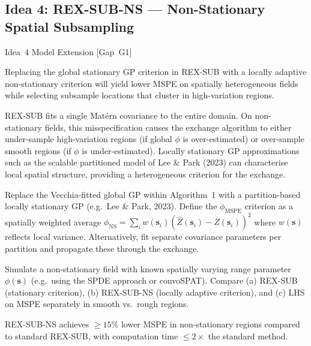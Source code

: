 \documentclass[12pt, a4paper]{article}
\newcommand{\mspe}{$\phi_{\text{MSPE}}$}
\begin{document}
\subsection{Idea 4: REX-SUB-NS --- Non-Stationary Spatial Subsampling}

\begin{ideabox}{Idea~4 \textbullet{} Model Extension [Gap~G1]}

\begin{description}[leftmargin=5em, labelwidth=4.5em]
  \item[\textbf{Hypothesis}]
    Replacing the global stationary GP criterion in REX-SUB with a locally adaptive
    non-stationary criterion will yield lower MSPE on spatially heterogeneous fields
    while selecting subsample locations that cluster in high-variation regions.

  \item[\textbf{Motivation}]
    REX-SUB fits a single Matérn covariance to the entire domain.  On non-stationary
    fields, this misspecification causes the exchange algorithm to either under-sample
    high-variation regions (if global $\phi$ is over-estimated) or over-sample smooth
    regions (if $\phi$ is under-estimated).  Locally stationary GP approximations
    such as the scalable partitioned model of Lee \& Park (2023) can characterise
    local spatial structure, providing a heterogeneous criterion for the exchange.

  \item[\textbf{Approach}]
    Replace the Vecchia-fitted global GP within Algorithm~1 with a partition-based
    locally stationary GP (e.g.\ Lee \& Park, 2023).  Define the \mspe{} criterion
    as a spatially weighted average $\phi_{\text{NS}} = \sum_i w(\mathbf{s}_i)
    (\hat{Z}(\mathbf{s}_i) - Z(\mathbf{s}_i))^2$ where $w(\mathbf{s})$ reflects
    local variance.  Alternatively, fit separate covariance parameters per partition
    and propagate these through the exchange.

  \item[\textbf{Key experiment}]
    Simulate a non-stationary field with known spatially varying range parameter
    $\phi(\mathbf{s})$ (e.g.\ using the SPDE approach or convoSPAT).  Compare
    (a) REX-SUB (stationary criterion), (b) REX-SUB-NS (locally adaptive criterion),
    and (c) LHS on MSPE separately in smooth vs.\ rough regions.

  \item[\textbf{Success criterion}]
    REX-SUB-NS achieves $\geq 15\%$ lower MSPE in non-stationary regions compared
    to standard REX-SUB, with computation time $\leq 2\times$ the standard method.


\end{description}
\end{ideabox}
\end{document}
